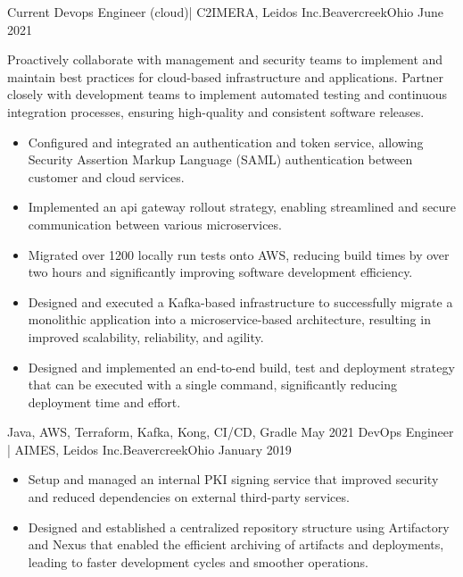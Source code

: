 %
%
%
\begin{experiences}

  \experience
  {Current} {Devops Engineer (cloud)| C2IMERA, Leidos Inc.}{Beavercreek}{Ohio}
  {June 2021} { Proactively collaborate with management and security teams to implement and maintain best practices for cloud-based infrastructure and applications. Partner closely with development teams to implement automated testing and continuous integration processes, ensuring high-quality and consistent software releases.
      \begin{itemize}
          \item Configured and integrated an authentication and token service, allowing Security Assertion Markup Language (SAML) authentication between customer and cloud services.
          \item Implemented an api gateway rollout strategy, enabling streamlined and secure communication between various microservices.
          \item Migrated over 1200 locally run tests onto AWS, reducing build times by over two hours and significantly improving software development efficiency.
          \item Designed and executed a Kafka-based infrastructure to successfully migrate a monolithic application into a microservice-based architecture, resulting in improved scalability, reliability, and agility.
          \item Designed and implemented an end-to-end build, test and deployment strategy that can be executed with a single command, significantly reducing deployment time and effort.
      \end{itemize}
  }
  {Java, AWS, Terraform, Kafka, Kong, CI/CD, Gradle}
  \emptySeparator
  \experience
  {May 2021} {DevOps Engineer | AIMES, Leidos Inc.}{Beavercreek}{Ohio}
  {January 2019} {
      \begin{itemize}
          \item Setup and managed an internal PKI signing service that improved security and reduced dependencies on external third-party services.
          \item Designed and established a centralized repository structure using Artifactory and Nexus that enabled the efficient archiving of artifacts and deployments, leading to faster development cycles and smoother operations.

\end{itemize}}
\end{experiences}
